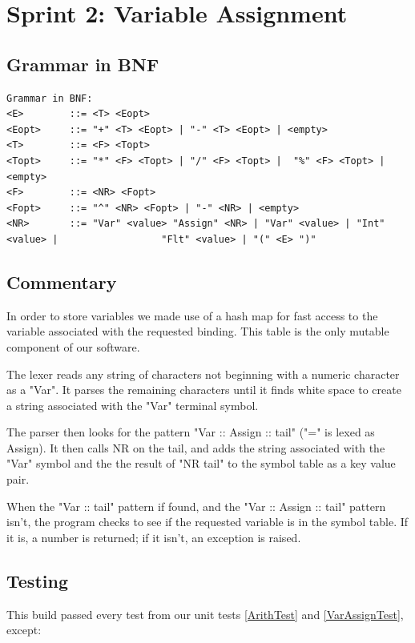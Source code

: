 \documentclass[a4paper, oneside, 11pt]{report}
\begin{document}
    \clearpage
    \section{Sprint 2: Variable Assignment}
    \subsection{Grammar in BNF}
    \begin{verbatim}
Grammar in BNF:
<E>        ::= <T> <Eopt>
<Eopt>     ::= "+" <T> <Eopt> | "-" <T> <Eopt> | <empty>
<T>        ::= <F> <Topt>
<Topt>     ::= "*" <F> <Topt> | "/" <F> <Topt> |  "%" <F> <Topt> |<empty>
<F>        ::= <NR> <Fopt>
<Fopt>     ::= "^" <NR> <Fopt> | "-" <NR> | <empty>
<NR>       ::= "Var" <value> "Assign" <NR> | "Var" <value> | "Int" <value> |                  "Flt" <value> | "(" <E> ")"

    \end{verbatim}

    \subsection{Commentary}
    In order to store variables we made use of a hash map for fast access to the variable associated with the requested binding. This table is the only mutable component of our software.

    The lexer reads any string of characters not beginning with a numeric character as a "Var". It parses the remaining characters until it finds white space to create a string associated with the "Var" terminal symbol.

    The parser then looks for the pattern "Var :: Assign :: tail" ("=" is lexed as Assign). It then calls NR on the tail, and adds the string associated with the "Var" symbol and the the result of "NR tail" to the symbol table as a key value pair.

    When the "Var :: tail" pattern if found, and the "Var :: Assign :: tail" pattern isn't, the program checks to see if the requested variable is in the symbol table. If it is, a number is returned; if it isn't, an exception is raised.

    \subsection{Testing}
    This build passed every test from our unit tests \ref{ArithTest} and \ref{VarAssignTest}, except:
\end{document}
